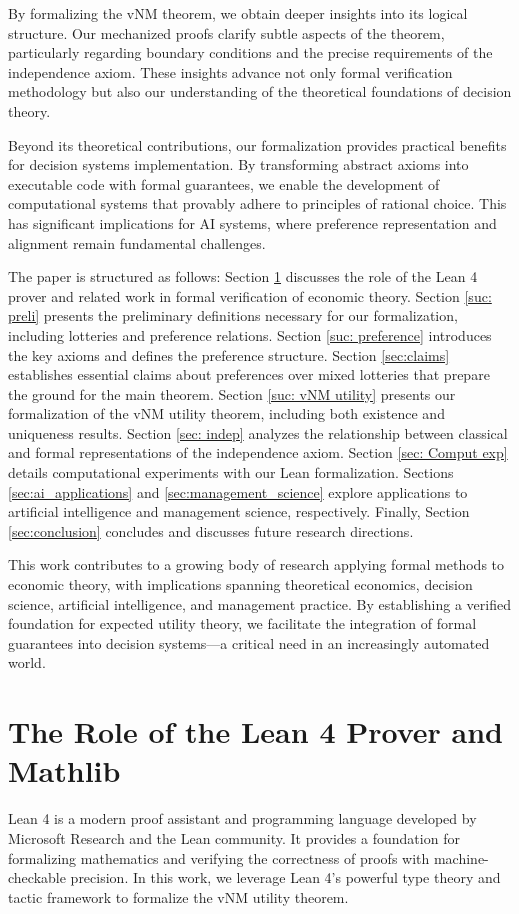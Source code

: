 \documentclass{article}
\theoremstyle{definition}
\begin{document}
By formalizing the vNM theorem, we obtain deeper insights into its logical structure. Our mechanized proofs clarify subtle aspects of the theorem, particularly regarding boundary conditions and the precise requirements of the independence axiom. These insights advance not only formal verification methodology but also our understanding of the theoretical foundations of decision theory.

Beyond its theoretical contributions, our formalization provides practical benefits for decision systems implementation. By transforming abstract axioms into executable code with formal guarantees, we enable the development of computational systems that provably adhere to principles of rational choice. This has significant implications for AI systems, where preference representation and alignment remain fundamental challenges.

The paper is structured as follows: Section \ref{sec:lean_role} discusses the role of the Lean 4 prover and related work in formal verification of economic theory. Section \ref{suc: preli} presents the preliminary definitions necessary for our formalization, including lotteries and preference relations. Section \ref{suc: preference} introduces the key axioms and defines the preference structure. Section \ref{sec:claims} establishes essential claims about preferences over mixed lotteries that prepare the ground for the main theorem. Section \ref{suc: vNM utility} presents our formalization of the vNM utility theorem, including both existence and uniqueness results. Section \ref{sec: indep} analyzes the relationship between classical and formal representations of the independence axiom. Section \ref{sec: Comput exp} details computational experiments with our Lean formalization. Sections \ref{sec:ai_applications} and \ref{sec:management_science} explore applications to artificial intelligence and management science, respectively. Finally, Section \ref{sec:conclusion} concludes and discusses future research directions.

This work contributes to a growing body of research applying formal methods to economic theory, with implications spanning theoretical economics, decision science, artificial intelligence, and management practice. By establishing a verified foundation for expected utility theory, we facilitate the integration of formal guarantees into decision systems—a critical need in an increasingly automated world.

\section{The Role of the Lean 4 Prover and Mathlib}\label{sec:lean_role}
Lean 4\cite{Lean4} is a modern proof assistant and programming language developed by Microsoft Research and the Lean community. It provides a foundation for formalizing mathematics and verifying the correctness of proofs with machine-checkable precision. In this work, we leverage Lean 4's powerful type theory and tactic framework to formalize the vNM utility theorem.
\end{document}
